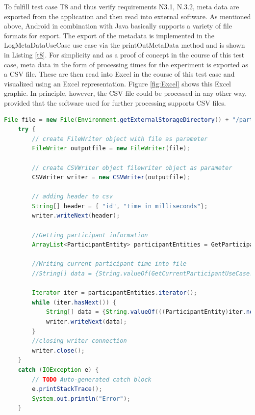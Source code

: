 To fulfill test case T8 and thus verify requirements N3.1, N.3.2, meta data are exported from the application and then read into external software. As mentioned above, Android in combination with Java basically supports a variety of file formats for export. The export of the metadata is implemented in the LogMetaDataUseCase use case via the printOutMetaData method and is shown in Listing \ref{t8}. For simplicity and as a proof of concept in the course of this test case, meta data in the form of processing times for the experiment is exported as a CSV file. These are then read into Excel in the course of this test case and visualized using an Excel representation. Figure \ref{fig:Excel} shows this Excel graphic. In principle, however, the CSV file could be processed in any other way, provided that the software used for further processing supports CSV files. 

\vspace{1cm}


\begin{lstlisting}[language=java,label=t8,lineskip={0pt}, caption=Collect time needed to conduct experiment (b), basicstyle=\scriptsize, captionpos=b]
    File file = new File(Environment.getExternalStorageDirectory() + "/participant" + GetCurrentParticipantUseCase.getInstance().getCurrentParticipant() + "TimeData.csv");
    try {
        // create FileWriter object with file as parameter
        FileWriter outputfile = new FileWriter(file);

        // create CSVWriter object filewriter object as parameter
        CSVWriter writer = new CSVWriter(outputfile);

        // adding header to csv
        String[] header = { "id", "time in milliseconds"};
        writer.writeNext(header);

        //Getting participant information
        ArrayList<ParticipantEntity> participantEntities = GetParticipantDataUseCase.getInstance().getParticipantData();

        //Writing current participant time into file
        //String[] data = {String.valueOf(GetCurrentParticipantUseCase.getInstance().getCurrentParticipant()), String.valueOf(timeDifference)};

        Iterator iter = participantEntities.iterator();
        while (iter.hasNext()) {
            String[] data = {String.valueOf(((ParticipantEntity)iter.next()).getId()), String.valueOf(((ParticipantEntity)iter.next()).getExperimentTime())};
            writer.writeNext(data);
        }
        //closing writer connection
        writer.close();
    }
    catch (IOException e) {
        // TODO Auto-generated catch block
        e.printStackTrace();
        System.out.println("Error");
    }
\end{lstlisting}

